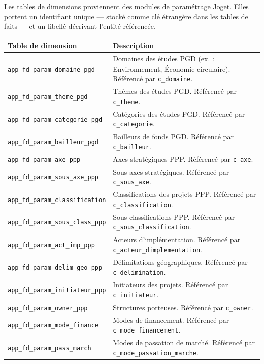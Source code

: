 Les tables de dimensions proviennent des modules de paramétrage
Joget. Elles portent un identifiant unique — stocké comme clé
étrangère dans les tables de faits — et un libellé décrivant
l'entité référencée.

\begin{longtable}{|p{5.5cm}|p{9cm}|}
\hline
\textbf{Table de dimension} & \textbf{Description} \\
\hline
\endhead

\texttt{app\_fd\_param\_domaine\_pgd} &
Domaines des études PGD (ex. : Environnement, Économie circulaire).
Référencé par \texttt{c\_domaine}. \\
\hline
\texttt{app\_fd\_param\_theme\_pgd} &
Thèmes des études PGD. Référencé par \texttt{c\_theme}. \\
\hline
\texttt{app\_fd\_param\_categorie\_pgd} &
Catégories des études PGD. Référencé par \texttt{c\_categorie}. \\
\hline
\texttt{app\_fd\_param\_bailleur\_pgd} &
Bailleurs de fonds PGD. Référencé par \texttt{c\_bailleur}. \\
\hline
\texttt{app\_fd\_param\_axe\_ppp} &
Axes stratégiques PPP. Référencé par \texttt{c\_axe}. \\
\hline
\texttt{app\_fd\_param\_sous\_axe\_ppp} &
Sous-axes stratégiques. Référencé par \texttt{c\_sous\_axe}. \\
\hline
\texttt{app\_fd\_param\_classification} &
Classifications des projets PPP. Référencé par \texttt{c\_classification}. \\
\hline
\texttt{app\_fd\_param\_sous\_class\_ppp} &
Sous-classifications PPP. Référencé par \texttt{c\_sous\_classification}. \\
\hline
\texttt{app\_fd\_param\_act\_imp\_ppp} &
Acteurs d'implémentation. Référencé par \texttt{c\_acteur\_dimplementation}. \\
\hline
\texttt{app\_fd\_param\_delim\_geo\_ppp} &
Délimitations géographiques. Référencé par \texttt{c\_delimination}. \\
\hline
\texttt{app\_fd\_param\_initiateur\_ppp} &
Initiateurs des projets. Référencé par \texttt{c\_initiateur}. \\
\hline
\texttt{app\_fd\_param\_owner\_ppp} &
Structures porteuses. Référencé par \texttt{c\_owner}. \\
\hline
\texttt{app\_fd\_param\_mode\_finance} &
Modes de financement. Référencé par \texttt{c\_mode\_financement}. \\
\hline
\texttt{app\_fd\_param\_pass\_march} &
Modes de passation de marché. Référencé par \texttt{c\_mode\_passation\_marche}. \\

\end{longtable}
